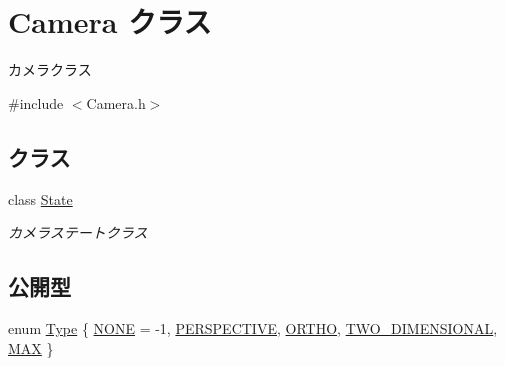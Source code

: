 \hypertarget{class_camera}{}\section{Camera クラス}
\label{class_camera}


カメラクラス  




{\ttfamily \#include $<$Camera.\+h$>$}

\subsection*{クラス}
\begin{DoxyCompactItemize}
\item 
class \mbox{\hyperlink{class_camera_1_1_state}{State}}
\begin{DoxyCompactList}\small\item\em カメラステートクラス \end{DoxyCompactList}\end{DoxyCompactItemize}
\subsection*{公開型}
\begin{DoxyCompactItemize}
\item 
enum \mbox{\hyperlink{class_camera_a3b0a1f58deca679ac665f61c480d1dcb}{Type}} \{ \newline
\mbox{\hyperlink{class_camera_a3b0a1f58deca679ac665f61c480d1dcba12c79dd5dae61a931ff74c2855ec82f5}{N\+O\+NE}} = -\/1, 
\mbox{\hyperlink{class_camera_a3b0a1f58deca679ac665f61c480d1dcba34783417054408fd9e024048b1cefa47}{P\+E\+R\+S\+P\+E\+C\+T\+I\+VE}}, 
\mbox{\hyperlink{class_camera_a3b0a1f58deca679ac665f61c480d1dcba5421bcd519dac606b7af9786b11f88d6}{O\+R\+T\+HO}}, 
\mbox{\hyperlink{class_camera_a3b0a1f58deca679ac665f61c480d1dcbaa144a5dc97bc343a7ef630cf23b09a76}{T\+W\+O\+\_\+\+D\+I\+M\+E\+N\+S\+I\+O\+N\+AL}}, 
\newline
\mbox{\hyperlink{class_camera_a3b0a1f58deca679ac665f61c480d1dcba7a6334fc8418deee4c453e1c7a366efa}{M\+AX}}
 \}
\end{DoxyCompactItemize}
